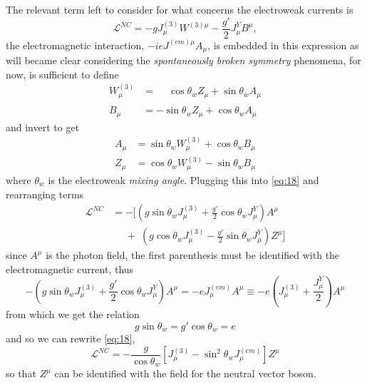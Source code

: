 The relevant term left to consider for what concerns the electroweak currents is
\begin{equation}
  \label{eq:18}
  \mathcal{L}^{NC} = -g J_{\mu}^{(3)} W^{(3) \mu} - \frac{g'}{2}
  J_{\mu}^{Y} B^{\mu},
\end{equation}
the electromagnetic interaction, $-i e J^{(em) \mu} A_{\mu}$, is embedded in
this expression as will became clear considering the \emph{spontaneously broken
  symmetry} phenomena, for now, is sufficient to define
\begin{equation}
  \label{eq:19}
  \begin{split}
    W^{(3)}_{\mu} &= \phantom{-} \cos \theta_{w} Z_{\mu} + \sin \theta_{w}
    A_{\mu}
    \\
    B^{\phantom{(3)}}_{\mu} &= - \sin \theta_{w} Z_{\mu} + \cos \theta_{w}
    A_{\mu}
  \end{split}
\end{equation}
and invert to get
\begin{equation}
  \label{eq:20}
  \begin{split}
    A_{\mu} &= \sin \theta_{w} W_{\mu}^{(3)} + \cos \theta_{w} B_{\mu}
    \\
    Z_{\mu} &= \cos \theta_{w} W_{\mu}^{(3)} - \sin \theta_{w} B_{\mu}
  \end{split}
\end{equation}
where $\theta_{w}$ is the electroweak \emph{mixing angle}. Plugging this into
\eqref{eq:18} and rearranging terms
\begin{equation}
  \label{eq:21}
  \begin{split}
    \mathcal{L}^{NC} &= -[(g \sin \theta_{w} J_{\mu}^{(3)} +
    \frac{g'}{2} \cos \theta_{w} J_{\mu}^{Y} ) A^{\mu} \\
    &\phantom{=} + \phantom{[}(g\cos \theta_{w} J_{\mu}^{(3)} - \frac{g'}{2}
    \sin \theta_{w} J_{\mu}^{Y}) Z^{\mu}]
  \end{split}
\end{equation}
since $A^{\mu}$ is the photon field, the first parenthesis must be identified
with the electromagnetic current, thus
\begin{equation}
  \label{eq:22}
  -(g \sin \theta_{w} J_{\mu}^{(3)} + \frac{g'}{2} \cos
  \theta_{w} J_{\mu}^{Y} ) A^{\mu} = - e J_{\mu}^{(em)} A^{\mu}
  \equiv - e ( J_{\mu}^{(3)} + \frac{J_{\mu}^{Y}}{2} ) A^{\mu}
\end{equation}
from which we get the relation
\begin{equation}
  \label{eq:23}
  g \sin \theta_{w} = g' \cos \theta_{w} = e
\end{equation}
and so we can rewrite \eqref{eq:18},
\begin{equation}
  \label{eq:24}
  \mathcal{L}^{NC} = - \frac{g}{\cos \theta_{w}} [J_{\mu}^{(3)} - \sin^{2} \theta_{w}
  J_{\mu}^{(em)}] Z^{\mu}
\end{equation}
so that $Z^{\mu}$ can be identified with the field for the neutral vector boson.
